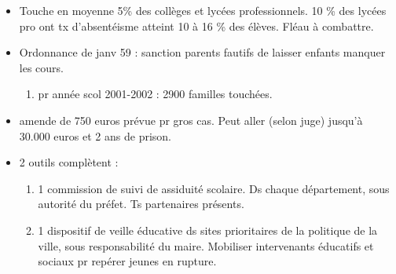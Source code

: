\documentclass[12pt]{article}
\begin{document}
\begin{itemize}
\item Touche en moyenne 5\% des collèges et lycées professionnels. 10 \% des lycées pro ont tx d'absentéisme atteint 10 à 16 \% des élèves. Fléau à combattre. \\

\item Ordonnance de janv 59 : sanction parents fautifs de laisser enfants manquer les cours.
\begin{enumerate}
\item pr année scol 2001-2002 : 2900 familles touchées.
\end{enumerate}



\vspace{0.5cm}

\item amende de 750 euros prévue pr gros cas. Peut aller (selon juge) jusqu'à 30.000 euros et 2 ans de prison. \\

\item 2 outils complètent : 
\begin{enumerate}
\item 1 commission de suivi de assiduité scolaire. Ds chaque département, sous autorité du préfet. Ts partenaires présents. \\
\item 1 dispositif de veille éducative ds sites prioritaires de la politique de la ville, sous responsabilité du maire. Mobiliser intervenants éducatifs et sociaux pr repérer jeunes en rupture. \\
\end{enumerate}


\end{itemize}
\end{document}
